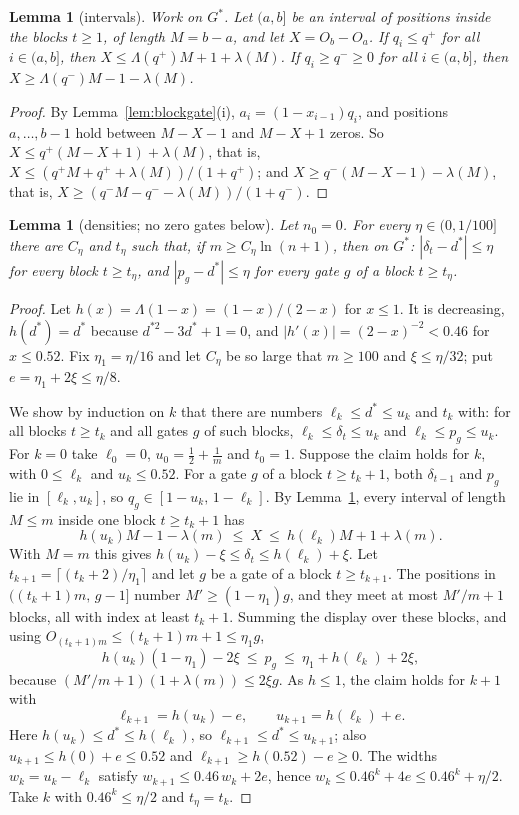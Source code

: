 \documentclass[11pt]{amsart}
\newtheorem{lemma}[theorem]{Lemma}
\theoremstyle{definition}
\theoremstyle{remark}
\begin{document}
\begin{lemma}[intervals]\label{lem:blockint}
Work on $G^*$. Let $(a,b]$ be an interval of positions inside the blocks $t\ge1$, of length
$M=b-a$, and let $X=O_b-O_a$. If $q_i\le q^+$ for all $i\in(a,b]$, then
$X\le\Lambda(q^+)M+1+\lambda(M)$. If $q_i\ge q^-\ge0$ for all $i\in(a,b]$, then
$X\ge\Lambda(q^-)M-1-\lambda(M)$.
\end{lemma}

\begin{proof}
By Lemma~\ref{lem:blockgate}(i), $a_i=(1-x_{i-1})q_i$, and positions $a,\dots,b-1$ hold between
$M-X-1$ and $M-X+1$ zeros. So $X\le q^+(M-X+1)+\lambda(M)$, that is,
$X\le(q^+M+q^++\lambda(M))/(1+q^+)$; and $X\ge q^-(M-X-1)-\lambda(M)$, that is,
$X\ge(q^-M-q^--\lambda(M))/(1+q^-)$.
\end{proof}

\begin{lemma}[densities; no zero gates below]\label{lem:blockdens}
Let $n_0=0$. For every $\eta\in(0,1/100]$ there are $C_\eta$ and $t_\eta$ such that, if
$m\ge C_\eta\ln(n+1)$, then on $G^*$: $|\delta_t-d^*|\le\eta$ for every block $t\ge t_\eta$, and
$|p_g-d^*|\le\eta$ for every gate $g$ of a block $t\ge t_\eta$.
\end{lemma}

\begin{proof}
Let $h(x)=\Lambda(1-x)=(1-x)/(2-x)$ for $x\le1$. It is decreasing, $h(d^*)=d^*$ because
$d^{*2}-3d^*+1=0$, and $|h'(x)|=(2-x)^{-2}<0.46$ for $x\le0.52$. Fix $\eta_1=\eta/16$ and let
$C_\eta$ be so large that $m\ge100$ and $\xi\le\eta/32$; put $e=\eta_1+2\xi\le\eta/8$.

We show by induction on $k$ that there are numbers $\ell_k\le d^*\le u_k$ and $t_k$ with: for all
blocks $t\ge t_k$ and all gates $g$ of such blocks, $\ell_k\le\delta_t\le u_k$ and
$\ell_k\le p_g\le u_k$. For $k=0$ take $\ell_0=0$, $u_0=\frac12+\frac1m$ and $t_0=1$. Suppose the
claim holds for $k$, with $0\le\ell_k$ and $u_k\le0.52$. For a gate $g$ of a block $t\ge t_k+1$,
both $\delta_{t-1}$ and $p_g$ lie in $[\ell_k,u_k]$, so $q_g\in[1-u_k,\,1-\ell_k]$. By
Lemma~\ref{lem:blockint}, every interval of length $M\le m$ inside one block $t\ge t_k+1$ has
\[
h(u_k)M-1-\lambda(m)\ \le\ X\ \le\ h(\ell_k)M+1+\lambda(m).
\]
With $M=m$ this gives $h(u_k)-\xi\le\delta_t\le h(\ell_k)+\xi$. Let $t_{k+1}=\lceil(t_k+2)/\eta_1\rceil$
and let $g$ be a gate of a block $t\ge t_{k+1}$. The positions in $((t_k+1)m,\,g-1]$ number
$M'\ge(1-\eta_1)g$, and they meet at most $M'/m+1$ blocks, all with index at least $t_k+1$. Summing
the display over these blocks, and using $O_{(t_k+1)m}\le(t_k+1)m+1\le\eta_1g$,
\[
h(u_k)(1-\eta_1)-2\xi\ \le\ p_g\ \le\ \eta_1+h(\ell_k)+2\xi ,
\]
because $(M'/m+1)(1+\lambda(m))\le2\xi g$. As $h\le1$, the claim holds for $k+1$ with
\[
\ell_{k+1}=h(u_k)-e,\qquad u_{k+1}=h(\ell_k)+e .
\]
Here $h(u_k)\le d^*\le h(\ell_k)$, so $\ell_{k+1}\le d^*\le u_{k+1}$; also
$u_{k+1}\le h(0)+e\le0.52$ and $\ell_{k+1}\ge h(0.52)-e\ge0$. The widths $w_k=u_k-\ell_k$ satisfy
$w_{k+1}\le0.46\,w_k+2e$, hence $w_k\le0.46^k+4e\le0.46^k+\eta/2$. Take $k$ with $0.46^k\le\eta/2$
and $t_\eta=t_k$.
\end{proof}
\end{document}
